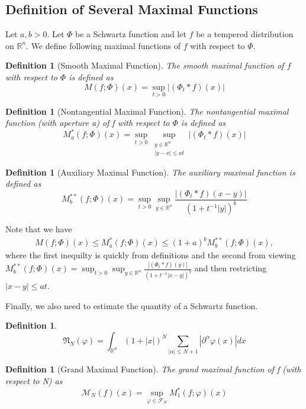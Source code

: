 \documentclass[12pt]{article}  %
\numberwithin{equation}{subsection}
\newtheorem{definition}[thm]{Definition}
\theoremstyle{plain}
\begin{document}
\subsection{Definition of Several Maximal Functions}
Let $a,b > 0$. Let $\varPhi$ be a Schwartz function and let $f$ be a tempered distribution on $\mathbb{R}^n$. We define following maximal functions of $f$ with respect to $\varPhi$.
\begin{definition}[Smooth Maximal Function]
	The smooth maximal function of $f$ with respect to $\varPhi$ is defined as $$M(f;\varPhi)(x) = \sup_{t>0}|(\varPhi_t*f)(x)|$$ 
\end{definition}

\begin{definition}[Nontangential Maximal Function]
	 The nontangential maximal function (with aperture a) of f with respect to $\varPhi$ is defined as $$M_a^*(f;\varPhi)(x) = \sup_{t>0}\sup_{\substack{y\in \mathbb{R}^n\\ |y-x|\le at}}|(\varPhi_t*f)(x)|$$
\end{definition}

\begin{definition}[Auxiliary Maximal Function]
	The auxiliary maximal function is defined as $$M_b^{**}(f;\varPhi)(x) = \sup_{t>0}\sup_{y \in \mathbb{R}^n}\frac{|(\varPhi_t*f)(x-y)|}{(1+t^{-1}|y|)^b}$$
\end{definition}

Note that we have 
\begin{align}
M(f;\varPhi)(x) \le M_a^*(f;\varPhi)(x) \le (1+a)^bM_b^{**}(f;\varPhi)(x),
\end{align}
where the first inequilty is quickly from definitions and the second from viewing $M_b^{**}(f;\varPhi)(x) = \sup_{t>0}\sup_{y \in \mathbb{R}^n}\frac{|(\varPhi_t*f)(y)|}{(1+t^{-1}|x-y|)^b} $ and then restricting $|x-y| \le at$.

Finally, we also need to estimate the quantity of a Schwartz function.
\begin{definition}
	$$\mathfrak{N}_N(\varphi) = \int_{\mathbb{R}^n}(1+|x|)^N\sum_{|\alpha|\le N+1}|\partial^\alpha\varphi(x)|dx$$
\end{definition}

\begin{definition}[Grand Maximal Function]
	The grand maximal function of f (with respect to N) as $$\mathcal{M}_N(f)(x) = \sup_{\varphi \in \mathcal{F}_N}M_1^*(f;\varphi)(x)$$
\end{definition}
\end{document}
